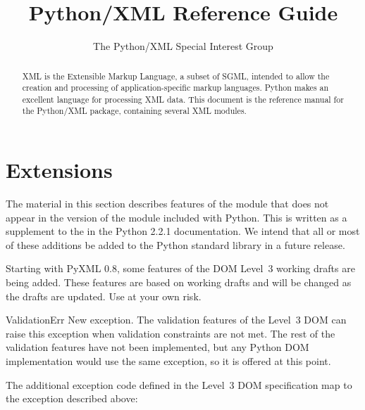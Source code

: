 \documentclass{howto}
\title{Python/XML Reference Guide}
\author{The Python/XML Special Interest Group}
\begin{document}
\maketitle

\begin{abstract}
\noindent
XML is the Extensible Markup Language, a subset of SGML, intended to
allow the creation and processing of application-specific markup
languages.  Python makes an excellent language for processing XML
data.  This document is the reference manual for the Python/XML
package, containing several XML modules.
\end{abstract}

\tableofcontents

\section{ Extensions}


\begin{notice}
  The material in this section describes features of the
   module that does not appear in the version of the
  module included with Python.  This is written as a supplement to the
   in
  the Python 2.2.1 documentation.  We intend that all or most of these
  additions be added to the Python standard library in a future
  release.
\end{notice}

Starting with PyXML 0.8, some features of the DOM Level~3 working
drafts are being added.  These features are based on working drafts
and will be changed as the drafts are updated.  Use at your own risk.

\begin{excdesc}{ValidationErr}
  New exception.  The validation features of the Level~3 DOM can raise
  this exception when validation constraints are not met.  The rest of
  the validation features have not been implemented, but any Python
  DOM implementation would use the same exception, so it is offered at
  this point.
\end{excdesc}

The additional exception code defined in the Level~3 DOM specification
map to the exception described above:
\end{document}

